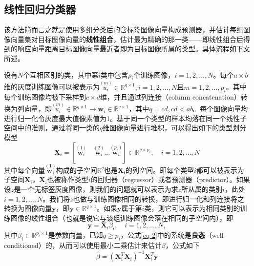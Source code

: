 \documentclass[UTF8]{ctexart}
\begin{document}
\subsection{线性回归分类器}
该方法简而言之就是使用多组分类后的含标签图像向量构成预测器，并估计每组图像向量集对目标图像向量的\textbf{线性组合}，估计最为精确的那一类——即线性组合后得到的响应向量距离目标图像向量最近者即为目标图像所属的类型。具体流程如下文所述。\par
设有\(N\)个互相区别的类，其中第\(i\)类中包含\(p_i\)个训练图像，\(i=1,2,...,N\)。每个\(a \times b\)维的灰度训练图像可以被表示为\({\stackrel{(m)}{u_i}} \in {\mathbb{R}^{q \times 1}}, i = 1,2,\dots,N\)且\(m = 1,2,\dots,p_i\)。其中每个训练图像均被下采样到\(c \times d\)维，并且通过列连接（column concatenation）转换为列向量，即\({\stackrel{(m)}{u_i}} \in {\mathbb{R}^{q \times 1}} \rightarrow {\mathbf{w}_i} \in \mathbb{R}^{q \times 1}\)，其中\(q=cd,cd<ab\)。每个图像向量均进行归一化令灰度最大值像素值为1。基于同一个类型的样本均落在同一个线性子空间中的准则，通过将同一类的\(q\)维图像向量进行堆积，可以得出如下的类型划分模型
\begin{equation}
    {\mathbf{X}_i = [\stackrel{(1)}{\mathbf{w}_i} \quad \stackrel{(2)}{\mathbf{w}_i} \dots \stackrel{(p_i)}{\mathbf{w}_i}] \in \mathbb{R}^{q \times p_i}},\quad i=1,2,\dots,N
\end{equation}
其中每个向量\(\mathbf{{\stackrel{(1)}{w_i}}}\)构成的子空间\(\mathbb{R}^{q}\)也是\(\mathbf{X_i}\)的列空间。即每个类型\(i\)都可以被表示为子空间\(\mathbf{X}_i\)，\(\mathbf{X}_i\)也被称作类型\(i\)的回归器（regressor）或者预测器（predictor）。如果设\(z\)是一个无标签灰度图像，则我们的问题就可以表示为求\(z\)所从属的类别\(i\)，此处\(i=1,2,...,N\)。我们将\(z\)也做与训练图像相同的转换，即进行归一化和列连接将之转换为图像向量\(\mathbf{y}\)，即\(\mathbf{y}\in\mathbb{R}^{q \times 1}\)。如果\(\mathbf{y}\)属于第\(i\)类，则它可以表示为相同类别的训练图像的线性组合（也就是说它与该组训练图像会落在相同的子空间内），即
\begin{equation}\label{eq-2} %
    \mathbf{y}=\mathbf{X}_i\beta_i,\quad i=1,2,\ldots,N,
\end{equation}
其中\(\beta_i\in\mathbb{R}^{p_i \times 1}\)是参数向量，已知\(q \ge p_i\)，公式\eqref{eq-2}中的系统是\textbf{良态}（well conditioned）的，从而可以使用最小二乘估计来估计\(\beta\)，公式如下
\begin{equation}\label{eq-3}
    \hat{\beta}={(\mathbf{X}^T_i\mathbf{X}_i)^{-1}\mathbf{X}^T_i\mathbf{y}}
\end{equation}
\end{document}
